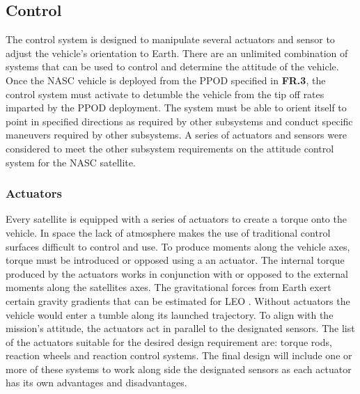 
\subsection{Control}
 The control system is designed to manipulate several actuators and sensor to adjust the vehicle's orientation to Earth. There are an unlimited combination of systems that can be used to control and determine the attitude of the vehicle. Once the NASC vehicle is deployed from the PPOD specified in \textbf{FR.3}, the control system must activate to detumble the vehicle from the tip off rates imparted by the PPOD deployment. The system must be able to orient itself to point in specified directions as required by other subsystems and conduct specific maneuvers required by other subsystems. A series of actuators and sensors were considered to meet the other subsystem requirements on the attitude control system for the NASC satellite.
\subsubsection{Actuators}
Every satellite is equipped with a series of actuators to create a torque onto the vehicle. In space the lack of atmosphere makes the use of traditional control surfaces difficult to control and use. To produce moments along the vehicle axes, torque must be introduced or opposed using a an actuator. The internal torque produced by the actuators works in conjunction with or opposed to the external moments along the satellites axes. The gravitational forces from Earth exert certain gravity gradients that can be estimated for LEO \cite{AttSim}. Without actuators the vehicle would enter a tumble along its launched trajectory. To align with the mission's attitude, the actuators act in parallel to the designated sensors. The list of the actuators suitable for the desired design requirement are: torque rods, reaction wheels and reaction control systems. The final design will include one or more of these systems to work along side the designated sensors as each actuator has its own advantages and disadvantages. 
%
